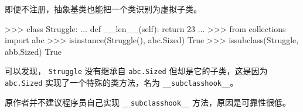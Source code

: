 即便不注册，抽象基类也能把一个类识别为虚拟子类。

\begin{python}
>>> class Struggle:
...     def __len__(self): return 23
...
>>> from collections import abc
>>> isinstance(Struggle(), abc.Sized)
True
>>> issubclass(Struggle, abb,Sized)
True
\end{python}

可以发现， \texttt{Struggle} 没有继承自 \texttt{abc.Sized} 但却是它的子类，这是因为 \texttt{abc.Sized} 实现了一个特殊的类方法，名为 \texttt{\_\_subclasshook\_\_}。



原作者并不建议程序员自己实现 \texttt{\_\_subclasshook\_\_} 方法，原因是可靠性很低。

\newpage